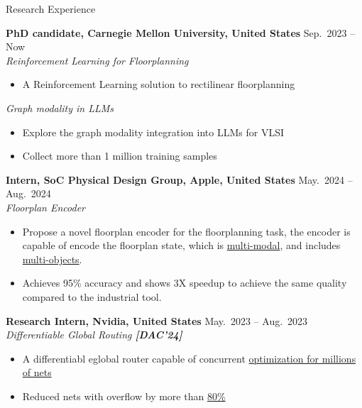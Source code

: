 
\begin{rSection}{Research Experience}

    {\bf PhD candidate, Carnegie Mellon University, United States}               \hfill { Sep.~2023 -- Now} \\
    \textit{Reinforcement Learning for Floorplanning}
    \begin{itemize}[noitemsep,topsep=-5pt]
        \item A Reinforcement Learning solution to rectilinear floorplanning
    \end{itemize} 
    \textit{Graph modality in LLMs}
    \begin{itemize}[noitemsep,topsep=-5pt]
        \item Explore the graph modality integration into LLMs for VLSI
        \item Collect more than 1 million training samples  \\
    \end{itemize} 
    {\bf Intern, SoC Physical Design Group, Apple, United States}               \hfill { May.~2024 -- Aug.~2024} \\
    \textit{Floorplan Encoder}
    \begin{itemize}[noitemsep,topsep=-5pt]
        \item Propose a novel floorplan encoder for the floorplanning task, the encoder is capable of encode the floorplan state, which is \underline{multi-modal}, and includes \underline{multi-objects}.
        \item Achieves 95\% accuracy and shows 3X speedup to achieve the same quality compared to the industrial tool.  \\
    \end{itemize}
    {\bf Research Intern, Nvidia, United States}               \hfill { May.~2023 -- Aug.~2023} \\
    \textit{Differentiable Global Routing \textbf{[{{DAC'24}}]}}
    \begin{itemize}[noitemsep,topsep=-5pt]
        \item A differentiabl eglobal router capable of concurrent \underline{optimization for millions of nets}
        \item Reduced nets with overflow by more than \underline{80\%} \\
    \end{itemize} 


\end{rSection}
